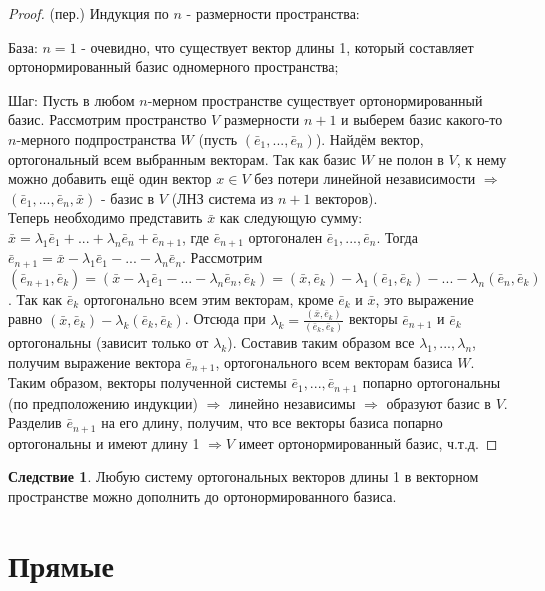 \documentclass[a4paper, 12pt]{article}
\theoremstyle{definition}
\newtheorem*{consequense}{Следствие}
\begin{document}
	\begin{proof}
		(пер.)
		Индукция по $n$ - размерности пространства:

		База: $n = 1$ - очевидно, что существует вектор длины 1, который составляет ортонормированный базис одномерного пространства;

		Шаг: Пусть в любом $n$-мерном пространстве существует ортонормированный базис. Рассмотрим пространство $V$ размерности $n+1$ и выберем базис какого-то $n$-мерного подпространства $W$ (пусть $(\bar{e}_{1},...,\bar{e}_{n})$). Найдём вектор, ортогональный всем выбранным векторам. Так как базис $W$ не полон в $V$, к нему можно добавить ещё один вектор $x \in V$ без потери линейной независимости $\Rightarrow$ $(\bar{e}_{1},...,\bar{e}_{n}, \bar{x})$ - базис в $V$ (ЛНЗ система из $n+1$ векторов). \\
		Теперь необходимо представить $\bar{x}$ как следующую сумму: $\bar{x} = \lambda_{1}\bar{e}_{1} + ... + \lambda_{n}\bar{e}_{n} + \bar{e}_{n+1}$, где $\bar{e}_{n+1}$ ортогонален $\bar{e}_{1},...,\bar{e}_{n}$. Тогда $\bar{e}_{n+1} = \bar{x} - \lambda_{1}\bar{e}_{1} - ... - \lambda_{n}\bar{e}_{n}$. Рассмотрим $(\bar{e}_{n+1}, \bar{e}_{k}) = (\bar{x} - \lambda_{1}\bar{e}_{1} - ... - \lambda_{n}\bar{e}_{n}, \bar{e}_{k}) = (\bar{x}, \bar{e}_{k}) - \lambda_{1}(\bar{e}_{1}, \bar{e}_{k}) - ... - \lambda_{n}(\bar{e}_{n}, \bar{e}_{k})$. Так как $\bar{e}_{k}$ ортогонально всем этим векторам, кроме $\bar{e}_{k}$ и $\bar{x}$, это выражение равно $(\bar{x}, \bar{e}_{k}) - \lambda_{k}(\bar{e}_{k}, \bar{e}_{k})$. Отсюда при $\lambda_{k} = \frac{(\bar{x}, \bar{e}_{k})}{(\bar{e}_{k}, \bar{e}_{k})}$ векторы $\bar{e}_{n+1}$ и $\bar{e}_{k}$ ортогональны (зависит только от $\lambda_{k}$). Составив таким образом все $\lambda_{1},...,\lambda_{n}$, получим выражение вектора $\bar{e}_{n+1}$, ортогонального всем векторам базиса $W$.
		Таким образом, векторы полученной системы $\bar{e}_{1},...,\bar{e}_{n+1}$ попарно ортогональны (по предположению индукции) $\Rightarrow$ линейно независимы $\Rightarrow$ образуют базис в $V$. Разделив $\bar{e}_{n+1}$ на его длину, получим, что все векторы базиса попарно ортогональны и имеют длину 1 $\Rightarrow V$ имеет ортонормированный базис, ч.т.д.
	\end{proof}
	\begin{consequense}
		Любую систему ортогональных векторов длины 1 в векторном пространстве можно дополнить до ортонормированного базиса.
	\end{consequense}
	\section{Прямые}
\end{document}
